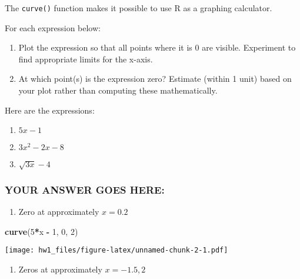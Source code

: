\documentclass[
]{article}
\newenvironment{Shaded}{\begin{snugshade}}{\end{snugshade}}
\newcommand{\DecValTok}[1]{\textcolor[rgb]{0.00,0.00,0.81}{#1}}
\newcommand{\KeywordTok}[1]{\textcolor[rgb]{0.13,0.29,0.53}{\textbf{#1}}}
\newcommand{\NormalTok}[1]{#1}
\newcommand{\OperatorTok}[1]{\textcolor[rgb]{0.81,0.36,0.00}{\textbf{#1}}}
\newcommand{\StringTok}[1]{\textcolor[rgb]{0.31,0.60,0.02}{#1}}
\providecommand{\tightlist}{%
  \setlength{\itemsep}{0pt}\setlength{\parskip}{0pt}}
\begin{document}
The \texttt{curve()} function makes it possible to use R as a graphing
calculator.

For each expression below:

\begin{enumerate}
\def\labelenumi{\arabic{enumi}.}
\item
  Plot the expression so that all points where it is 0 are visible.
  Experiment to find appropriate limits for the x-axis.
\item
  At which point(s) is the expression zero? Estimate (within 1 unit)
  based on your plot rather than computing these mathematically.
\end{enumerate}

Here are the expressions:

\begin{enumerate}
\def\labelenumi{\arabic{enumi}.}
\tightlist
\item
  \(5x - 1\)
\item
  \(3x^2 - 2x - 8\)
\item
  \(\sqrt{3x} - 4\)
\end{enumerate}

\hypertarget{your-answer-goes-here}{%
\subsubsection{YOUR ANSWER GOES HERE:}\label{your-answer-goes-here}}

\begin{enumerate}
\def\labelenumi{\arabic{enumi}.}
\tightlist
\item
  Zero at approximately \(x = 0.2\)
\end{enumerate}

\begin{Shaded}
\begin{Highlighting}[]
\KeywordTok{curve}\NormalTok{(}\DecValTok{5}\OperatorTok{*}\NormalTok{x }\OperatorTok{{-}}\StringTok{ }\DecValTok{1}\NormalTok{, }\DecValTok{0}\NormalTok{, }\DecValTok{2}\NormalTok{)}
\end{Highlighting}
\end{Shaded}

\texttt{[image: hw1\_files/figure-latex/unnamed-chunk-2-1.pdf]}

\begin{enumerate}
\def\labelenumi{\arabic{enumi}.}
\setcounter{enumi}{1}
\tightlist
\item
  Zeros at approximately \(x = -1.5, 2\)
\end{enumerate}
\end{document}
